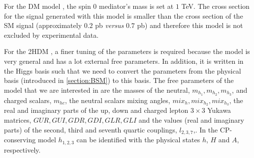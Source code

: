 
For the DM model \cite{DM}, the spin 0 mediator's mass is set at $1$ TeV. The cross section for the signal generated with this model is smaller than the cross section of the SM signal (approximately $0.2$ pb \textit{versus} $0.7$ pb) and therefore this model is not excluded by experimental data.

For the 2HDM \cite{2HDM,2HDM1}, a finer tuning of the parameters is required because the model is very general and has a lot external free parameters. In addition, it is written in the Higgs basis such that we need to convert the parameters from the physical basis (introduced in \ref{section:BSM}) to this basis. The free parameters of the model that we are interested in are the masses of the neutral, $m_{h_1}, m_{h_2}, m_{h_3}$, and charged scalars, $m_{hc}$, the neutral scalars mixing angles, $mix_h, mix_{h_2}, mix_{h_3}$, the real and imaginary parts of the up, down and charged lepton $3\times 3$ Yukawa matrices, $GUR, GUI, GDR, GDI, GLR, GLI$ and the values (real and imaginary parts) of the second, third and seventh quartic couplings, $l_{2,3,7}$,. In the CP-conserving model $h_{1,2,3}$ can be identified with the physical states $h$, $H$ and $A$, respectively.

